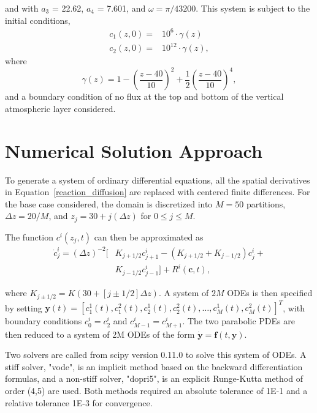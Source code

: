 \documentclass[twocolumn,10pt]{asme2ej}
\begin{document}
and with $a_3$ = 22.62, $a_4$ = 7.601, and $\omega = \pi/43200$. This system is subject to the initial conditions,
\begin{equation}
\begin{split}
c_1(z, 0) = & 10^6    \cdot \gamma(z)     \\
c_2(z, 0) = & 10^{12} \cdot \gamma(z),
\end{split}
\end{equation}
where
\begin{equation}
\gamma(z) = 1 - \left(\frac{z-40}{10} \right)^2 + \frac{1}{2} \left(\frac{z-40}{10} \right)^4,
\end{equation}
and a boundary condition of no flux at the top and bottom of the vertical atmospheric layer considered.

\section{Numerical Solution Approach}

To generate a system of ordinary differential equations, all the spatial derivatives in Equation~\ref{reaction_diffusion} are replaced with centered finite differences. For the base case considered, the domain is discretized into $M = 50$ partitions, $\Delta z = 20/M$, and $z_j = 30 + j(\Delta z)$ for $0 \leq j \leq M$.

The function $c^i(z_j,t)$ can then be approximated as
\begin{equation}
\begin{split}
\dot c^i_j = (\Delta z)^{-2} [& K_{j+1/2} c^i_{j+1} - (K_{j+1/2} +  K_{j-1/2}) c^i_{j} + \\
& K_{j-1/2} c^i_{j-1}] + R^i(\boldsymbol{c}, t),
\end{split}
\end{equation}

\noindent where $K_{j \pm 1/2} = K(30+[j \pm 1/2] \Delta z)$. A system of $2M$ ODEs is then specified by setting $\boldsymbol{y}(t)=[c^1_1(t), c^2_1(t), c^1_2(t), c^2_2(t), \ldots, c^1_M(t),c^2_M(t)]^T$, with boundary conditions $c^i_0 = c^i_2$ and $c^i_{M-1} = c^i_{M+1}$. The two parabolic PDEs are then reduced to a system of 2M ODEs of the form $\dot{\boldsymbol{y}} = \boldsymbol{f} (t, \boldsymbol{y})$.

Two solvers are called from scipy version 0.11.0 to solve this system of ODEs. A stiff solver, "vode", is an implicit method based on the backward differentiation formulas, and a non-stiff solver, "dopri5", is an explicit Runge-Kutta method of order (4,5) are used. Both methods required an absolute tolerance of 1E-1 and a relative tolerance 1E-3 for convergence.
\end{document}
